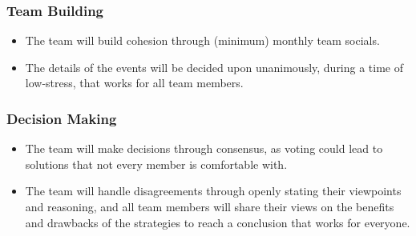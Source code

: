 \documentclass{article}
\begin{document}
\subsubsection*{Team Building}
\begin{itemize}
  \item The team will build cohesion through (minimum) monthly team socials.
  \item The details of the events will be decided upon unanimously, during a time of low-stress,
  that works for all team members.
\end{itemize}

\subsubsection*{Decision Making} 
\begin{itemize}
  \item The team will make decisions through consensus, as voting could lead to solutions that
  not every member is comfortable with.
  \item The team will handle disagreements through openly stating their viewpoints and
  reasoning, and all team members will share their views on the benefits and drawbacks of
  the strategies to reach a conclusion that works for everyone.
\end{itemize}
\end{document}
